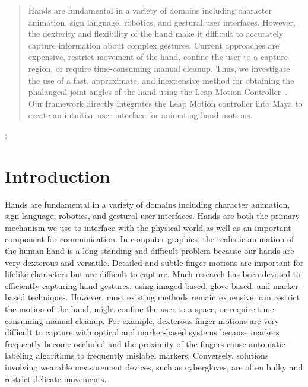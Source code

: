 \documentclass[review]{acmsiggraph}
\begin{document}
\begin{abstract}

Hands are fundamental in a variety of domains including 
character animation, sign language, robotics, and 
gestural user interfaces. However, the dexterity and
flexibility of the hand make it difficult to accurately capture
information about complex gestures. Current approaches
are expensive, restrict movement of the hand, confine the
user to a capture region, or require time-consuming manual 
cleanup. Thus, we investigate the use of a fast, approximate, 
and inexpensive method for obtaining the phalangeal joint 
angles of the hand using the Leap Motion Controller~\cite{LEA}. 
Our framework directly integrates the Leap Motion controller 
into Maya to create an intuitive user interface for animating hand motions.

\end{abstract}

\begin{CRcatlist}
  ;
\end{CRcatlist}

\keywordlist

\TOGlinkslist

\copyrightspace

\section{Introduction}

Hands are fundamental in a variety of domains including 
character animation, sign language, robotics, and 
gestural user interfaces. Hands are both the 
primary mechanism we use to interface with the physical
world as well as an important component for communication. 
In computer graphics, the realistic animation of the
human hand is a long-standing and difficult  problem 
because our hands are very dexterous and versatile.
Detailed and subtle finger motions are important for 
lifelike characters but are difficult to capture.
Much research has been devoted to efficiently 
capturing hand gestures, using imaged-based, glove-based, 
and marker-based techniques. However, most existing methods remain
expensive, can restrict the motion of the hand, might confine the user to a
space, or require time-consuming manual cleanup.
For example, dexterous finger motions are very difficult to capture with 
optical and marker-based systems because markers frequently 
become occluded and the proximity of the fingers cause automatic 
labeling algorithms to frequently mislabel markers.  Conversely, solutions 
involving wearable measurement devices, such as cybergloves, are 
often bulky and restrict delicate movements. 
\end{document}
